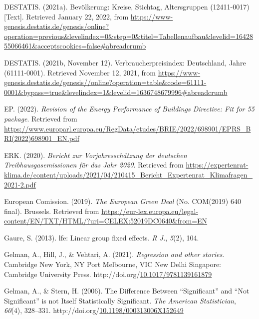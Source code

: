 \documentclass[12pt,twoside]{reedthesis}
\newlength{\cslhangindent}
\newenvironment{CSLReferences}[2] %
 {%
  \setlength{\parindent}{0pt}
  \ifodd #1 \everypar{\setlength{\hangindent}{\cslhangindent}}\ignorespaces\fi
  \ifnum #2 > 0
  \setlength{\parskip}{#2\baselineskip}
  \fi
 }%
 {}
\begin{document}
\begin{CSLReferences}{1}{0}
\leavevmode{}%
DESTATIS. (2021a). Bevölkerung: Kreise, Stichtag, Altersgruppen (12411-0017) {[}Text{]}. Retrieved January 22, 2022, from \url{https://www-genesis.destatis.de/genesis/online?operation=previous\&levelindex=0\&step=0\&titel=Tabellenaufbau\&levelid=1642855066461\&acceptscookies=false\#abreadcrumb}

\leavevmode{}%
DESTATIS. (2021b, November 12). Verbraucherpreisindex: Deutschland, Jahre (61111-0001). Retrieved November 12, 2021, from \url{https://www-genesis.destatis.de/genesis//online?operation=table\&code=61111-0001\&bypass=true\&levelindex=1\&levelid=1636748679996\#abreadcrumb}

\leavevmode{}%
EP. (2022). \emph{Revision of the Energy Performance of Buildings Directive: Fit for 55 package}. Retrieved from \url{https://www.europarl.europa.eu/RegData/etudes/BRIE/2022/698901/EPRS_BRI(2022)698901_EN.pdf}

\leavevmode{}%
ERK. (2020). \emph{Bericht zur Vorjahresschätzung der deutschen Treibhausgasemissionen für das Jahr 2020}. Retrieved from \url{https://expertenrat-klima.de/content/uploads/2021/04/210415_Bericht_Expertenrat_Klimafragen_2021-2.pdf}

\leavevmode{}%
European Comission. (2019). \emph{The European Green Deal} (No. COM(2019) 640 final). Brussels. Retrieved from \url{https://eur-lex.europa.eu/legal-content/EN/TXT/HTML/?uri=CELEX:52019DC0640\&from=EN}

\leavevmode{}%
Gaure, S. (2013). lfe: Linear group fixed effects. \emph{R J.}, \emph{5}(2), 104.

\leavevmode{}%
Gelman, A., Hill, J., \& Vehtari, A. (2021). \emph{Regression and other stories}. Cambridge New York, NY Port Melbourne, VIC New Delhi Singapore: Cambridge University Press. http://doi.org/\href{https://doi.org/10.1017/9781139161879}{10.1017/9781139161879}

\leavevmode{}%
Gelman, A., \& Stern, H. (2006). The Difference Between {``Significant''} and {``Not Significant''} is not Itself Statistically Significant. \emph{The American Statistician}, \emph{60}(4), 328--331. http://doi.org/\href{https://doi.org/10.1198/000313006X152649}{10.1198/000313006X152649}


\end{CSLReferences}
\end{document}
